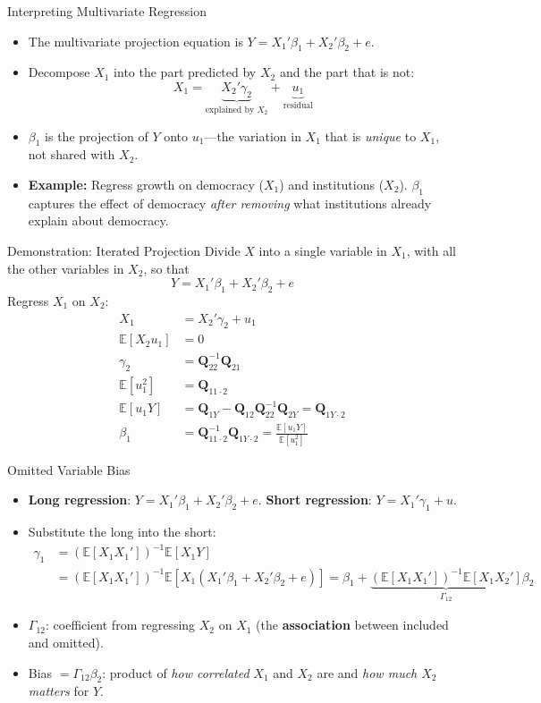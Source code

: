 \documentclass[aspectratio=169, handout, t]{beamer}
\numberwithin{equation}{section}
\begin{document}
\begin{frame}{Interpreting Multivariate Regression}
\begin{itemize}
\item The multivariate projection equation is $Y=X_1'\beta_1+X_2'\beta_2+e$.
\item Decompose $X_1$ into the part predicted by $X_2$ and the part that is not:
$$X_1 = \underbrace{X_2'\gamma_2}_{\text{explained by }X_2} + \underbrace{u_1}_{\text{residual}}$$
\pause
\item $\beta_1$ is the projection of $Y$ onto $u_1$---the variation in $X_1$ that is \emph{unique} to $X_1$, not shared with $X_2$.
\pause
\item \textbf{Example:} Regress growth on democracy ($X_1$) and institutions ($X_2$).  $\beta_1$ captures the effect of democracy \emph{after removing} what institutions already explain about democracy.
\end{itemize}
\end{frame}

\begin{frame}{Demonstration: Iterated Projection}
Divide $X$ into a single variable in $X_1$, with all the other variables in $X_2$, so that
$$Y=X_1'\beta_1+X_2'\beta_2+e$$
Regress $X_1$ on $X_2$:
\begin{align*}
X_1&=X_2'\gamma_2+u_1\\
\mathbb{E}[X_2u_1]&=0\\
\gamma_2&=\mathbf{Q}_{22}^{-1} \mathbf{Q}_{21}\\
\mathbb{E}[u_1^2]&=\mathbf{Q}_{11\cdot 2}\\
\mathbb{E}[u_1Y]&=\mathbf{Q}_{1Y}-\mathbf{Q}_{12}\mathbf{Q}^{-1}_{22}\mathbf{Q}_{2Y}=\mathbf{Q}_{1Y\cdot2}\\
\beta_1&=\mathbf{Q}_{11\cdot 2}^{-1} \mathbf{Q}_{1Y\cdot 2}=\frac{\mathbb{E}[u_1Y]}{\mathbb{E}[u_1^2]}
\end{align*}
\end{frame}

\begin{frame}{Omitted Variable Bias}
\begin{itemize}
\item \textbf{Long regression}: $Y=X_1'\beta_1+X_2'\beta_2+e$. \quad \textbf{Short regression}: $Y=X_1'\gamma_1+u$.
\pause
\item Substitute the long into the short:
\begin{align*}
\gamma_1&=(\mathbb{E}[X_1X_1'])^{-1}\mathbb{E}[X_1Y]\\
&=(\mathbb{E}[X_1X_1'])^{-1}\mathbb{E}[X_1(X_1'\beta_1+X_2'\beta_2+e)]
=\beta_1+\underbrace{(\mathbb{E}[X_1X_1'])^{-1}\mathbb{E}[X_1X_2']}_{\Gamma_{12}}\beta_2
\end{align*}
\pause
\item $\Gamma_{12}$: coefficient from regressing $X_2$ on $X_1$ (the \textbf{association} between included and omitted).
\item \alert{Bias} $= \Gamma_{12}\beta_2$: product of \emph{how correlated} $X_1$ and $X_2$ are and \emph{how much $X_2$ matters} for $Y$.
\end{itemize}
\end{frame}
\end{document}
